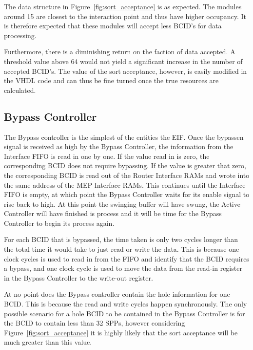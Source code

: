 			The data structure in Figure~\ref{fig:sort_acceptance} is as expected.
			The modules around 15 are closest to the interaction point and thus have higher occupancy.
			It is therefore expected that these modules will accept less BCID's for data processing.

			Furthermore, there is a diminishing return on the faction of data accepted.
			A threshold value above 64 would not yield a significant increase in the number of accepted BCID's.
			The value of the sort acceptance, however, is easily modified in the VHDL code and can thus be fine turned once the true resources are calculated.

	\subsection{Bypass Controller} %
	\label{sub:bypass}
		
		The Bypass controller is the simplest of the entities the EIF.
		Once the bypass\textunderscore en signal is received as high by the Bypass Controller, the information from the Interface FIFO is read in one by one.
		If the value read in is zero, the corresponding BCID does not require bypassing.
		If the value is greater that zero, the corresponding BCID is read out of the Router Interface RAMs and wrote into the same address of the MEP Interface RAMs.
		This continues until the Interface FIFO is empty, at which point the Bypass Controller waits for its enable signal to rise back to high.
		At this point the swinging buffer will have swung, the Active Controller will have finished is process and it will be time for the Bypass Controller to begin its process again.

		For each BCID that is bypassed, the time taken is only two cycles longer than the total time it would take to just read or write the data.
		This is because one clock cycles is used to read in from the FIFO and identify that the BCID requires a bypass, and one clock cycle is used to move the data from the read-in register in the Bypass Controller to the write-out register.

		At no point does the Bypass controller contain the hole information for one BCID.
		This is because the read and write cycles happen synchronously.
		The only possible scenario for a hole BCID to be contained in the Bypass Controller is for the BCID to contain less than 32 SPPs, however considering Figure~\ref{fig:sort_acceptance} it is highly likely that the sort acceptance will be much greater than this value.

